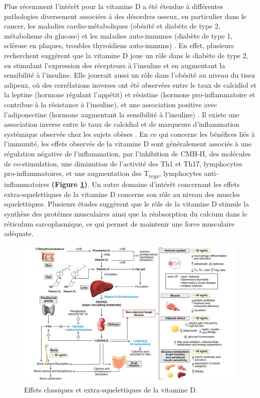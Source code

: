 \documentclass[
  a4paper,
  DIV=11,
  numbers=noendperiod,
  listof=totoc]{scrreprt}
\begin{document}
Plus récemment l'intérêt pour la vitamine D a été étendue à différentes
pathologies diversement associées à des désordres osseux, en particulier
dans le cancer, les maladies cardio-métaboliques (obésité et diabète de
type 2, métabolisme du glucose) et les maladies auto-immunes (diabète de
type 1, sclérose en plaques, troubles thyroïdiens auto-immuns)
\autocite{Dankers.2017,Caprio.2017}. En effet, plusieurs recherchent
suggèrent que la vitamine D joue un rôle dans le diabète de type 2, en
stimulant l'expression des récepteurs à l'insuline et en augmentant la
sensibilité à l'insuline. Elle jouerait aussi un rôle dans l'obésité au
niveau du tissu adipeux, où des corrélations inverses ont été observées
entre le taux de calcidiol et la leptine (hormone régulant l'appétit) et
résistine (hormone pro-inflammatoire et contribue à la résistance à
l'insuline), et une association positive avec l'adiponectine (hormone
augmentant la sensibilité à l'insuline)
\autocite{Caprio.2017,Bellia.2013}. Il existe une association inverse
entre le taux de calcidiol et de marqueurs d'inflammation systémique
observée chez les sujets obèses \autocite{Bellia.2013}. En ce qui
concerne les bénéfices liés à l'immunité, les effets observés de la
vitamine D sont généralement associés à une régulation négative de
l'inflammation, par l'inhibition de \ac{CMH-II}, des molécules de
co-stimulation, une diminution de l'activité des Th1 et Th17,
lymphocytes pro-inflammatoires, et une augmentation des
T\textsubscript{regs}, lymphocytes anti-inflammatoires \textbf{(Figure
\ref{fig:extra-skeletal})}. Un autre domaine d'intérêt concernant les
effets extra-squelettiques de la vitamine D concerne son rôle au niveau
des muscles squelettiques. Plusieurs études suggèrent que le rôle de la
vitamine D stimule la synthèse des protéines musculaires ainsi que la
réabsorption du calcium dans le réticulum sarcoplasmique, ce qui permet
de maintenir une force musculaire adéquate.

\begin{landscape}
\begin{figure}
\includegraphics{figures/extra-skeletal-effect.png} 
\caption[\textbf{Effets classiques et extra-squelettiques de la vitamine D.}]
{Effets classiques et extra-squelettiques de la vitamine D. \cite{Caprio.2017}}
\label{fig:extra-skeletal}
\end{figure}
\end{landscape}
\end{document}
